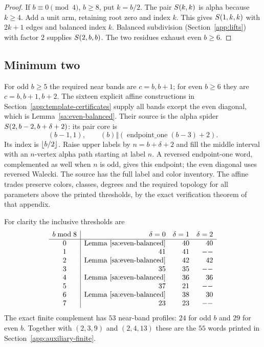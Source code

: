 \begin{proof}
If $b\equiv0\pmod4$, $b\ge8$, put $k=b/2$. The pair $S\!\left(k,k\right)$ is alpha because $k\ge4$. Add a unit arm, retaining root zero and index $k$. This gives $S\!\left(1,k,k\right)$ with $2k+1$ edges and balanced index $k$. Balanced subdivision (Section~\ref{app:lifts}) with factor $2$ supplies $S\!\left(2,b,b\right)$. The two residues exhaust even $b\ge6$.
\end{proof}

\subsection{Minimum two}
For odd $b\ge5$ the required near bands are $c=b,b+1$; for even $b\ge6$ they are $c=b,b+1,b+2$. The sixteen explicit affine constructions in Section~\ref{app:template-certificates} supply all bands except the even diagonal, which is Lemma~\ref{sa:even-balanced}. Their source is the alpha spider $S\!\left(2,b-2,b+\delta+2\right)$: its pair core is
\[
(b-1,1),\qquad (b)\Vert(\operatorname{endpoint\_one}(b-3)+2).
\]
Its index is $\left\lfloor b/2\right\rfloor$. Raise upper labels by $n=b+\delta+2$ and fill the middle interval with an $n$-vertex alpha path starting at label $n$. A reversed endpoint-one word, complemented as well when $n$ is odd, gives this endpoint; the even diagonal uses reversed Walecki. The source has the full label and color inventory. The affine trades preserve colors, classes, degrees and the required topology for all parameters above the printed thresholds, by the exact verification theorem of that appendix.

For clarity the inclusive thresholds are
\[
\begin{array}{c|rrr}
b\bmod8&\delta=0&\delta=1&\delta=2\\\hline
0&\text{Lemma~\ref{sa:even-balanced}}&40&40\\
1&41&41&--\\
2&\text{Lemma~\ref{sa:even-balanced}}&42&42\\
3&35&35&--\\
4&\text{Lemma~\ref{sa:even-balanced}}&36&36\\
5&37&21&--\\
6&\text{Lemma~\ref{sa:even-balanced}}&38&30\\
7&23&23&--
\end{array}
\]
The exact finite complement has $53$ near-band profiles: $24$ for odd $b$ and $29$ for even $b$. Together with $(2,3,9)$ and $(2,4,13)$ these are the $55$ words printed in Section~\ref{app:auxiliary-finite}.

